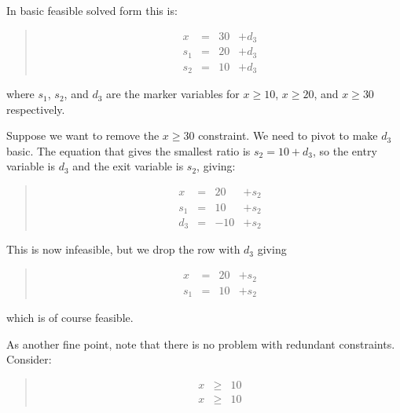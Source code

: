 \documentclass{article}
\begin{document}
In basic feasible solved form this is:

\begin{quote}\vspace*{-1ex}
$$
\begin{array}{rlrrr} 
x & = & 30 & + d_3   \\ \hline
s_1 & = & 20 & + d_3 \\
s_2 & = & 10 & + d_3 
\end{array}
$$
\end{quote}\vspace{-0.9ex}

where $s_1$, $s_2$, and $d_3$ are the marker variables for 
$x \geq 10$, $x \geq 20$, and $x \geq 30$ respectively.

Suppose we want to remove the $x \geq 30$ constraint.  We need to pivot to
make $d_3$ basic.  The equation that gives the smallest ratio is 
$s_2  = 10  + d_3$, so the entry variable is $d_3$ and the exit variable is
$s_2$, giving:

\begin{quote}\vspace*{-1ex}
$$
\begin{array}{rlrrr} 
x & = & 20 & + s_2   \\ \hline
s_1 & = & 10 & + s_2 \\
d_3 & = & -10 & + s_2 
\end{array}
$$
\end{quote}\vspace{-0.9ex}

This is now infeasible, but we drop the row with $d_3$ giving 

\begin{quote}\vspace*{-1ex}
$$
\begin{array}{rlrrr} 
x & = & 20 & + s_2   \\ \hline
s_1 & = & 10 & + s_2 
\end{array}
$$
\end{quote}\vspace{-0.9ex}

which is of course feasible.

As another fine point, note that there is no problem with redundant
constraints.  Consider:

\begin{quote}\vspace*{-1ex}
$$
\begin{array}{rlrrr} 
x & \geq & 10   \\
x & \geq & 10 
\end{array}
$$
\end{quote}\vspace{-0.9ex}
\end{document}
